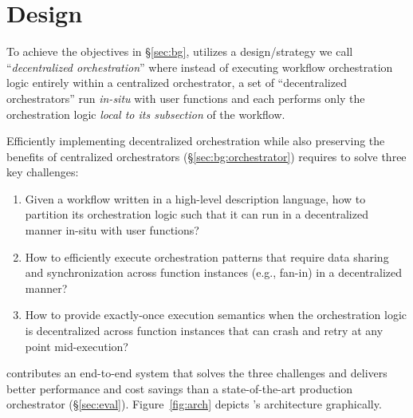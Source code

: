 \section{Design}

To achieve the objectives in \S\ref{sec:bg}, \name{} utilizes a
design/strategy we call ``\emph{decentralized orchestration}'' where instead
of executing workflow orchestration logic entirely within a centralized
orchestrator, a set of ``decentralized orchestrators'' run \emph{in-situ} with
user functions and each performs only the orchestration logic \emph{local to
its subsection} of the workflow.

Efficiently implementing decentralized orchestration while also preserving the
benefits of centralized orchestrators (\S\ref{sec:bg:orchestrator}) requires
\name{} to solve three key challenges:

\begin{enumerate}

	\item Given a workflow written in a high-level description language, how
	to partition its orchestration logic such that it can run in a
	decentralized manner in-situ with user functions?

	\item How to efficiently execute orchestration patterns that require data
	sharing and synchronization across function instances (e.g., fan-in) in a
	decentralized manner?

	\item How to provide exactly-once execution semantics when the
	orchestration logic is decentralized across function instances that can
	crash and retry at any point mid-execution?

\end{enumerate}

\name{} contributes an end-to-end system that solves the three challenges and
delivers better performance and cost savings than a state-of-the-art
production orchestrator (\S\ref{sec:eval}). Figure~\ref{fig:arch} depicts
\name{}'s architecture graphically.

